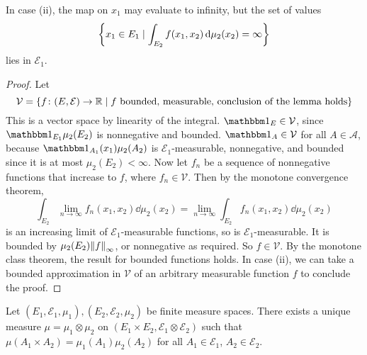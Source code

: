 \begin{remark}
	In case (ii), the map on \( x_1 \) may evaluate to infinity, but the set of values
	\[ \qty{x_1 \in E_1 \mid \int_{E_2} f(x_1,x_2) \dd{\mu_2(x_2)} = \infty} \]
	lies in \( \mathcal E_1 \).
\end{remark}
\begin{proof}
	Let
	\[ \mathcal V = \qty{f \colon (E,\mathcal E) \to \mathbb R \mid f \text{ bounded, measurable, conclusion of the lemma holds}} \]
	This is a vector space by linearity of the integral.
	\( \mathbbm 1_E \in \mathcal V \), since \( \mathbbm 1_{E_1} \mu_2(E_2) \) is nonnegative and bounded.
	\( \mathbbm 1_A \in \mathcal V \) for all \( A \in \mathcal A \), because \( \mathbbm 1_{A_1}(x_1) \mu_2(A_2) \) is \( \mathcal E_1 \)-measurable, nonnegative, and bounded since it is at most \( \mu_2(E_2) < \infty \).
	Now let \( f_n \) be a sequence of nonnegative functions that increase to \( f \), where \( f_n \in \mathcal V \).
	Then by the monotone convergence theorem,
	\[ \int_{E_2} \lim_{n \to \infty} f_n(x_1, x_2) \dd{\mu_2(x_2)} = \lim_{n \to \infty} \int_{E_2} f_n(x_1, x_2) \dd{\mu_2(x_2)} \]
	is an increasing limit of \( \mathcal E_1 \)-measurable functions, so is \( \mathcal E_1 \)-measurable.
	It is bounded by \( \mu_2(E_2) \norm{f}_\infty \), or nonnegative as required.
	So \( f \in \mathcal V \).
	By the monotone class theorem, the result for bounded functions holds.
	In case (ii), we can take a bounded approximation in \( \mathcal V \) of an arbitrary measurable function \( f \) to conclude the proof.
\end{proof}
\begin{theorem}
	Let \( (E_1, \mathcal E_1, \mu_1), (E_2, \mathcal E_2, \mu_2) \) be finite measure spaces.
	There exists a unique measure \( \mu = \mu_1 \otimes \mu_2 \) on \( (E_1 \times E_2, \mathcal E_1 \otimes \mathcal E_2) \) such that \( \mu(A_1 \times A_2) = \mu_1(A_1) \mu_2(A_2) \) for all \( A_1 \in \mathcal E_1 \), \( A_2 \in \mathcal E_2 \).
\end{theorem}
